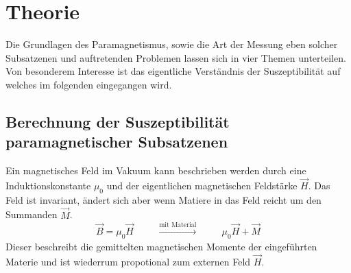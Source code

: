 \section{Theorie}
Die Grundlagen des Paramagnetismus, sowie die Art der Messung eben solcher Subsatzenen und auftretenden Problemen 
lassen sich in vier Themen unterteilen. Von besonderem Interesse ist das eigentliche Verständnis der Suszeptibilität 
auf welches im folgenden eingegangen wird.

\subsection{Berechnung der Suszeptibilität paramagnetischer Subsatzenen}
Ein magnetisches Feld im Vakuum kann beschrieben werden durch eine Induktionskonstante $\mu_0$ und der eigentlichen magnetischen Feldstärke
$\vec{H}$. Das Feld ist invariant, ändert sich aber wenn Matiere in das Feld reicht um den Summanden $\vec{M}$. 
\begin{equation}
    \vec{B}=\mu_0 \vec{H} \hspace{1cm} \xrightarrow[]{\text{mit Material}} \hspace{1cm} \mu_0 \vec{H} + \vec{M}
\end{equation}
Dieser beschreibt die gemittelten magnetischen Momente der eingeführten Materie und ist wiederrum propotional zum externen Feld $\vec{H}$. 


